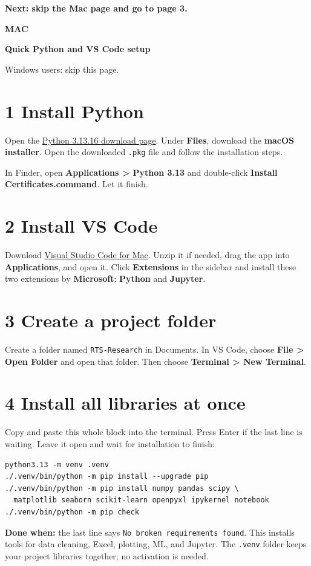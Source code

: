 \documentclass[11pt,letterpaper]{article}
\newcommand{\heading}[2]{{\small\color{accent}\textbf{#1}}\par{\LARGE\bfseries #2}\par}
\begin{document}
\textbf{Next: skip the Mac page and go to page 3.}

\newpage
\heading{MAC}{Quick Python and VS Code setup}
Windows users: skip this page.

\section*{1 \quad Install Python}
Open the \href{https://www.python.org/downloads/release/python-31316/}{Python 3.13.16 download page}.
Under \textbf{Files}, download the \textbf{macOS installer}.
Open the downloaded \texttt{.pkg} file and follow the installation steps.

In Finder, open \textbf{Applications > Python 3.13} and double-click
\textbf{Install Certificates.command}. Let it finish.

\section*{2 \quad Install VS Code}
Download \href{https://code.visualstudio.com/Download}{Visual Studio Code for Mac}.
Unzip it if needed, drag the app into \textbf{Applications}, and open it.
Click \textbf{Extensions} in the sidebar and install these two extensions
by \textbf{Microsoft}: \textbf{Python} and \textbf{Jupyter}.

\section*{3 \quad Create a project folder}
Create a folder named \texttt{RTS-Research} in Documents.
In VS Code, choose \textbf{File > Open Folder} and open that folder.
Then choose \textbf{Terminal > New Terminal}.

\section*{4 \quad Install all libraries at once}
Copy and paste this whole block into the terminal. Press Enter if the last
line is waiting. Leave it open and wait for installation to finish:
\begin{lstlisting}
python3.13 -m venv .venv
./.venv/bin/python -m pip install --upgrade pip
./.venv/bin/python -m pip install numpy pandas scipy \
  matplotlib seaborn scikit-learn openpyxl ipykernel notebook
./.venv/bin/python -m pip check
\end{lstlisting}
\textbf{Done when:} the last line says \texttt{No broken requirements found}.
This installs tools for data cleaning, Excel, plotting, ML, and Jupyter.
The \texttt{.venv} folder keeps your project libraries together; no activation is needed.
\end{document}
